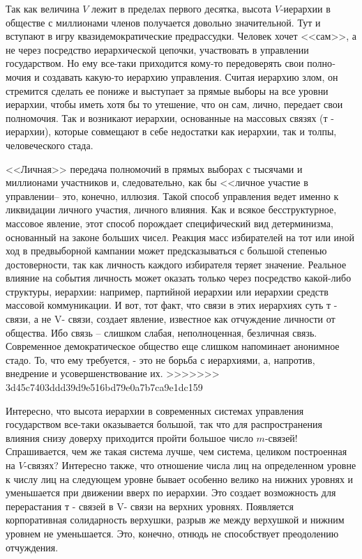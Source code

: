 \documentclass{book}
\begin{document}
Так как величина $V$  лежит в пределах первого десятка, высо­та $V$-иерархии в обществе с миллионами членов получается до­вольно значительной. Тут и вступают в игру квазидемократические предрассудки. Человек хочет <<сам>>, а не через посредство иерархической цепочки, участвовать в управлении государством. Но ему все-таки приходится кому-то передоверять свои полно­мочия и создавать какую-то иерархию управления. Считая иерар­хию злом, он стремится сделать ее пониже и выступает за пря­мые выборы на все уровни иерархии, чтобы иметь хотя бы то утешение, что он сам, лично,  передает свои полномочия. Так и возникают иерархии, основанные на массовых связях (т -  иерархии), которые совмещают в себе недостатки как иерархии, так и толпы, человеческого стада.

<<Личная>> передача полномочий в прямых выборах с тысячами и миллионами участников и, следовательно, как бы <<личное уча­стие в управлении-- это, конечно, иллюзия. Такой способ управле­ния ведет именно к ликвидации личного участия, личного влия­ния. Как и всякое бесструктурное, массовое явление, этот спо­соб порождает специфический вид детерминизма, основанный на законе больших чисел. Реакция масс избирателей на тот или иной ход в предвыборной кампании может предсказываться с большой степенью достоверности, так как личность каждо­го избирателя теряет значение. Реальное влияние на события личность может оказать только через посредство какой-либо структуры, иерархии: например, партийной иерархии или иерар­хии средств массовой коммуникации. И вот, тот факт, что связи в этих иерархиях суть т -  связи, а не V-  связи, создает явление, известное как отчуждение  личности от общества. Ибо связь -- слишком слабая, неполноценная, безличная связь. Современное демократическое общество еще слишком напоминает аноним­ное 
стадо.  То, что ему требуется, - это не борьба с иерархиями, а, напротив, внедрение и усовершенствование их.
>>>>>>> 3d45c7403ddd39d9e516bd79e0a7b7ca9e1dc159

Интересно, что высота иерархии в современных системах уп­равления государством все-таки оказывается большой, так что для распространения влияния снизу доверху приходится пройти большое число $m$-связей! Спрашивается, чем же такая система лучше, чем система, целиком построенная на $V$-связях? Инте­ресно также, что отношение числа лиц на определенном уровне к числу лиц на следующем уровне бывает особенно велико на нижних уровнях и уменьшается при движении вверх по иерар­хии. Это создает возможность для перерастания т -  связей в V-  связи на верхних уровнях. Появляется корпоративная соли­дарность верхушки, разрыв же между верхушкой и нижним уровнем не уменьшается. Это, конечно, отнюдь не способствует преодолению отчуждения.
\end{document}
